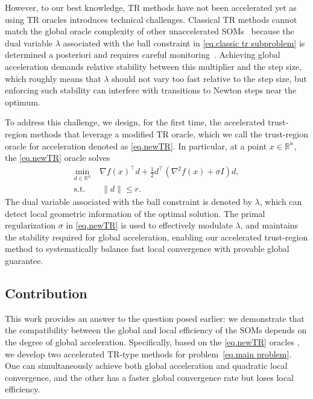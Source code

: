 \documentclass{article}
\begin{document}
However, to our best knowledge,  TR methods have not been accelerated yet as
using TR oracles introduces technical challenges. Classical TR methods cannot match the global oracle complexity of other unaccelerated SOMs~\cite{cartis2010on,curtis2017trust} because the dual variable $\lambda$ associated with the ball constraint in \eqref{eq.classic tr subproblem} is determined a posteriori and requires careful monitoring~\cite{curtis2018concise}. Achieving global acceleration demands relative stability between this multiplier and the step size, which roughly means that $\lambda$ should not vary too fast relative to the step size, but enforcing such stability can interfere with transitions to Newton steps near the optimum.

To address this challenge, we design, for the first time, the accelerated trust-region methods that leverage a modified TR oracle, which we call the trust-region oracle for acceleration denoted as \ref{eq.newTR}. In particular, at a point $x \in \mathbb{R}^n$, the \ref{eq.newTR} oracle solves
\begin{equation*}
    \begin{aligned}
        \min_{d \in \mathbb{R}^n}~ & \nabla f(x)^\top d
        + \tfrac{1}{2} d^\top (\nabla^2 f(x) + \sigma I) d, \\
        \text{s.t.}                & ~ \|d\| \le r.
    \end{aligned}
    \tag*{(TR$_+$)}
\end{equation*}
The dual variable associated with the ball constraint is denoted by $\lambda$, which can detect local geometric information of the optimal solution.
The primal regularization $\sigma$ in \ref{eq.newTR} is used to effectively modulate $\lambda$, and maintains the stability required for global acceleration, enabling our accelerated trust-region method to systematically balance fast local convergence with provable global guarantee.
\subsection{Contribution}
This work provides an answer to the question posed earlier: we demonstrate that the compatibility between the global and local efficiency of the SOMs depends on the degree of global acceleration.
Specifically, based on the \ref{eq.newTR} oracles \cite{jiang2026beyond}, we develop two accelerated TR-type methods for problem~\eqref{eq.main problem}. One can simultaneously achieve both global acceleration and quadratic local convergence, and the other has a faster global convergence rate but loses local efficiency.
\end{document}
